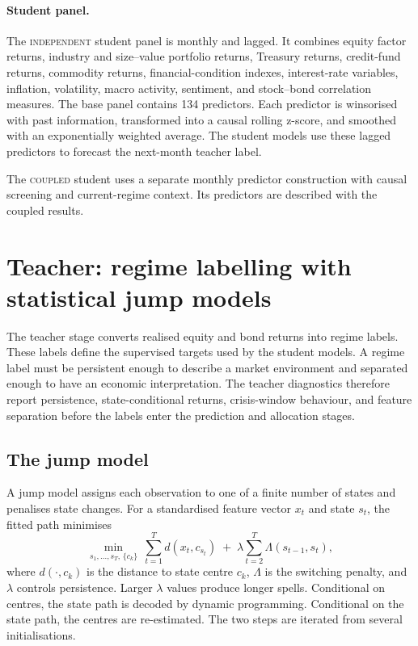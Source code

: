 \documentclass[10pt]{article}
\newcommand{\Acoup}{\textsc{coupled}}
\newcommand{\Bindep}{\textsc{independent}}
\begin{document}
\paragraph{Student panel.}
The \Bindep{} student panel is monthly and lagged. It combines equity factor returns, industry and size--value portfolio returns, Treasury returns, credit-fund returns, commodity returns, financial-condition indexes, interest-rate variables, inflation, volatility, macro activity, sentiment, and stock--bond correlation measures. The base panel contains 134 predictors. Each predictor is winsorised with past information, transformed into a causal rolling z-score, and smoothed with an exponentially weighted average. The student models use these lagged predictors to forecast the next-month teacher label.

The \Acoup{} student uses a separate monthly predictor construction with causal screening and current-regime context. Its predictors are described with the coupled results.

\section{Teacher: regime labelling with statistical jump models}
\label{sec:teacher}

The teacher stage converts realised equity and bond returns into regime labels. These labels
define the supervised targets used by the student models. A regime label must be
persistent enough to describe a market environment and separated enough to have an economic
interpretation. The teacher diagnostics therefore report persistence, state-conditional
returns, crisis-window behaviour, and feature separation before the labels enter the
prediction and allocation stages.

\subsection{The jump model}

A jump model assigns each observation to one of a finite number of states and penalises state
changes. For a standardised feature vector \(x_t\) and state \(s_t\), the fitted path
minimises
\begin{equation}
\min_{s_1,\dots,s_T,\,\{c_k\}}\ \sum_{t=1}^{T} d(x_t,c_{s_t})\;+\;\lambda\sum_{t=2}^{T}\Lambda(s_{t-1},s_t),
\label{eq:jump-generic}
\end{equation}
where \(d(\cdot,c_k)\) is the distance to state centre \(c_k\), \(\Lambda\) is the switching
penalty, and \(\lambda\) controls persistence. Larger \(\lambda\) values produce longer
spells. Conditional on centres, the state path is decoded by dynamic programming.
Conditional on the state path, the centres are re-estimated. The two steps are iterated from
several initialisations.
\end{document}
